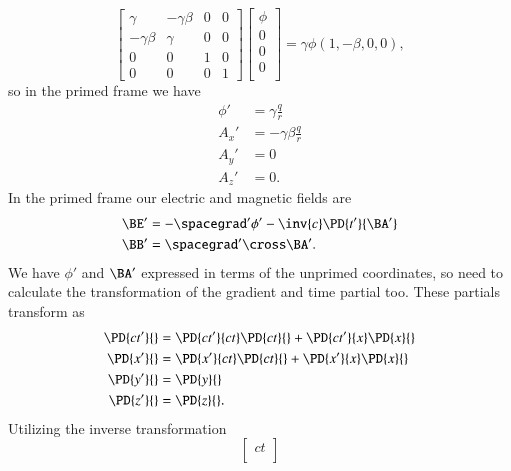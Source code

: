 {\begin{equation}
\begin{bmatrix}
\gamma & -\gamma \beta & 0 & 0 \\
-\gamma \beta & \gamma & 0 & 0 \\
0 & 0 & 1 & 0 \\
0 & 0 & 0 & 1
\end{bmatrix}
\begin{bmatrix}
\phi \\
0 \\
0 \\
0 \\
\end{bmatrix}
= \gamma \phi ( 1, -\beta, 0, 0 ),
\end{equation}
so in the primed frame we have
\begin{equation}\label{eqn:relElectroDynProblemSet2:970}
\begin{aligned}
\phi' &= \gamma \frac{q}{r} \\
A_x' &= -\gamma \beta \frac{q}{r} \\
A_y' &= 0 \\
A_z' &= 0.
\end{aligned}
\end{equation}
In the primed frame our electric and magnetic fields are
%
\begin{equation}\label{eqn:relElectroDynProblemSet2:990}
\begin{aligned}
\BE' &= - \spacegrad' \phi' - \inv{c} \PD{t'}{\BA'} \\
\BB' &= \spacegrad' \cross \BA'.
\end{aligned}
\end{equation}
%
We have \(\phi'\) and \(\BA'\) expressed in terms of the unprimed coordinates, so need to calculate the transformation of the gradient and time partial too.  These partials transform as
%
\begin{equation}\label{eqn:relElectroDynProblemSet2:1010}
\begin{aligned}
\PD{c t'}{} &= \PD{ct'}{ct} \PD{ct}{} + \PD{ct'}{x} \PD{x}{} \\
\PD{x'}{} &= \PD{x'}{ct} \PD{ct}{} + \PD{x'}{x} \PD{x}{} \\
\PD{y'}{} &= \PD{y}{} \\
\PD{z'}{} &= \PD{z}{}.
\end{aligned}
\end{equation}
%
Utilizing the inverse transformation
%
\begin{equation}\label{eqn:relElectroDynProblemSet2:1030}
\begin{bmatrix}
ct \\

\end{bmatrix}
\end{equation}}
